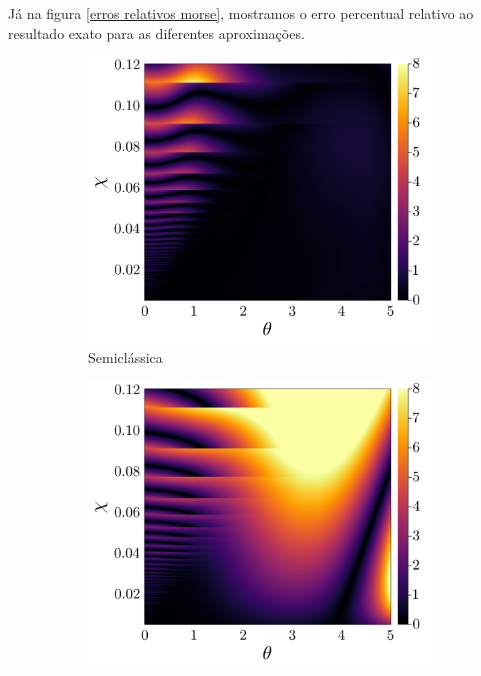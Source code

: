 \documentclass[
	12pt,
	oneside,			%
	a4paper,			%
	english,			%
	brazil				%
	]{abntex2}
\theoremstyle{definition}
\begin{document}
Já na figura \ref{erros relativos morse}, mostramos o erro percentual relativo ao resultado exato para as diferentes aproximações.
\begin{figure}[H]
     \centering
     \begin{subfigure}[b]{0.32\textwidth}
         \centering
         \includegraphics[width=\textwidth]{Imagens/error_sc.png}
         \caption{Semiclássica}
         \label{erro relativo morse sc}
     \end{subfigure}
     \hfill
     \begin{subfigure}[b]{0.32\textwidth}
         \centering
         \includegraphics[width=\textwidth]{Imagens/error_dm.png}

\end{subfigure}
\end{figure}
\end{document}
